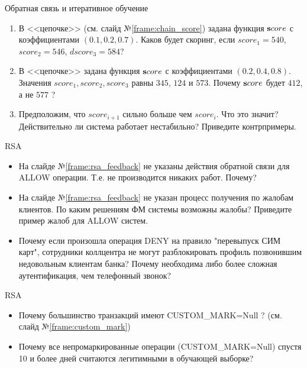 \begin{frame}{Обратная связь и итеративное обучение}
	\begin{enumerate}
		\item В <<цепочке>> (см. слайд №\ref{frame:chain_score}) задана функция
		$\bold score$ с коэффициентами $(0.1, 0.2, 0.7)$. Каков будет скоринг, 
		если $score_1=540$, $score_2=546$, $dscore_3=584$?
		\item В <<цепочке>> задана функция 	$\bold score$ 
		с коэффициентами $(0.2, 0.4, 0.8)$. Значения $score_1, score_2, score_3$
		равны $345$, $124$ и $573$. Почему $\bold score$ 
		будет $412$, 
		а не $577$ ?
		\item Предположим, что $score_{i+1}$ 
		сильно больше чем $score_i$. Что это значит? 
		Действительно ли система работает нестабильно? 
		Приведите контрпримеры.
		
	\end{enumerate}
\end{frame}

\begin{frame}{RSA}
	\begin{itemize}
		\item На слайде №\ref{frame:rsa_feedback} не указаны действия
		обратной связи для ALLOW операции. Т.е. не производится никаких работ. 
		Почему?
		\item На слайде №\ref{frame:rsa_feedback} не указан процесс получения 
		по жалобам клиентов. По каким решениям ФМ системы возможны жалобы? 
		Приведите пример жалоб для ALLOW систем. 
		\item Почему если произошла операция DENY на правило "перевыпуск СИМ карт", 
		сотрудники коллцентра не могут разблокировать профиль позвонившим
		недовольным клиентам банка? Почему необходима либо более сложная аутентификация, чем 
		телефонный звонок?
	\end{itemize}
\end{frame}

\begin{frame}{RSA}
\begin{itemize}
	\item Почему большинство транзакций имеют CUSTOM\_MARK=Null ?
	(см. слайд №\ref{frame:custom_mark})
	\item Почему все непромаркированные операции (CUSTOM\_MARK=Null) спустя 10 и более дней считаются 
	легитимными в обучающей выборке?
\end{itemize}
\end{frame}

